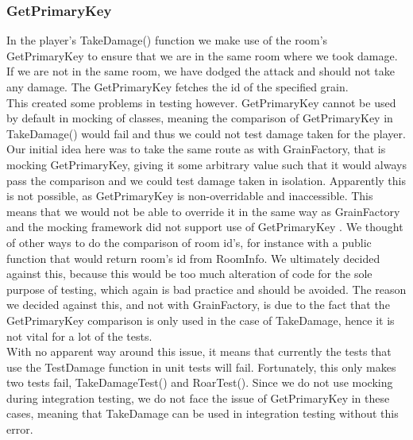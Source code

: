 \subsubsection{GetPrimaryKey}
In the player's TakeDamage() function we make use of the room's GetPrimaryKey to ensure that we are in the same room where we took damage. If we are not in the same room, we have dodged the attack and should not take any damage. The GetPrimaryKey fetches the id of the specified grain. \\
This created some problems in testing however. GetPrimaryKey cannot be used by default in mocking of classes, meaning the comparison of GetPrimaryKey in TakeDamage() would fail and thus we could not test damage taken for the player. \\
Our initial idea here was to take the same route as with GrainFactory, that is mocking GetPrimaryKey, giving it some arbitrary value such that it would always pass the comparison and we could test damage taken in isolation. Apparently this is not possible, as GetPrimaryKey is non-overridable and inaccessible. This means that we would not be able to override it in the same way as GrainFactory and the mocking framework did not support use of GetPrimaryKey . We thought of other ways to do the comparison of room id's, for instance with a public function that would return room's id from RoomInfo. We ultimately decided against this, because this would be too much alteration of code for the sole purpose of testing, which again is bad practice and should be avoided. The reason we decided against this, and not with GrainFactory, is due to the fact that the GetPrimaryKey comparison is only used in the case of TakeDamage, hence it is not vital for a lot of the tests. \\
With no apparent way around this issue, it means that currently the tests that use the TestDamage function in unit tests will fail. Fortunately, this only makes two tests fail, TakeDamageTest() and RoarTest(). Since we do not use mocking during integration testing, we do not face the issue of GetPrimaryKey in these cases, meaning that TakeDamage can be used in integration testing without this error. 
